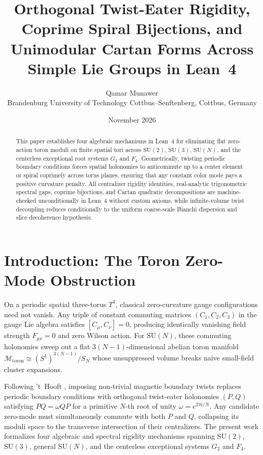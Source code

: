 \documentclass[11pt,a4paper]{article}
\title{Orthogonal Twist-Eater Rigidity, Coprime Spiral Bijections, and Unimodular Cartan Forms Across Simple Lie Groups in Lean~4}
\author{Qamar Munawer \\ \small Brandenburg University of Technology Cottbus--Senftenberg, Cottbus, Germany}
\date{November 2026}
\newcommand{\SU}{\mathrm{SU}}
\begin{document}
\maketitle

\begin{abstract}
This paper establishes four algebraic mechanisms in Lean~4 for eliminating flat zero-action toron moduli on finite spatial tori across $\SU(2)$, $\SU(3)$, $\SU(N)$, and the centerless exceptional root systems $G_2$ and $F_4$. Geometrically, twisting periodic boundary conditions forces spatial holonomies to anticommute up to a center element or spiral coprimely across torus planes, ensuring that any constant color mode pays a positive curvature penalty. All centralizer rigidity identities, real-analytic trigonometric spectral gaps, coprime bijections, and Cartan quadratic decompositions are machine-checked unconditionally in Lean~4 without custom axioms, while infinite-volume twist decoupling reduces conditionally to the uniform coarse-scale Bianchi dispersion and slice decoherence hypothesis.
\end{abstract}

\section{Introduction: The Toron Zero-Mode Obstruction}
On a periodic spatial three-torus $T^3$, classical zero-curvature gauge configurations need not vanish. Any triple of constant commuting matrices $(C_1, C_2, C_3)$ in the gauge Lie algebra satisfies $[C_\mu, C_\nu] = 0$, producing identically vanishing field strength $F_{\mu\nu} = 0$ and zero Wilson action. For $\SU(N)$, these commuting holonomies sweep out a flat $3(N-1)$-dimensional abelian toron manifold $\mathcal{M}_{\mathrm{toron}} \cong (S^1)^{3(N-1)} / S_N$ whose unsuppressed volume breaks naive small-field cluster expansions.

Following 't~Hooft \cite{tHooft1979}, imposing non-trivial magnetic boundary twists replaces periodic boundary conditions with orthogonal twist-eater holonomies $(P, Q)$ satisfying $PQ = \omega QP$ for a primitive $N$-th root of unity $\omega = e^{2\pi \mathrm{i} / N}$. Any candidate zero-mode must simultaneously commute with both $P$ and $Q$, collapsing its moduli space to the transverse intersection of their centralizers. The present work formalizes four algebraic and spectral rigidity mechanisms spanning $\SU(2)$, $\SU(3)$, general $\SU(N)$, and the centerless exceptional systems $G_2$ and $F_4$.
\end{document}
